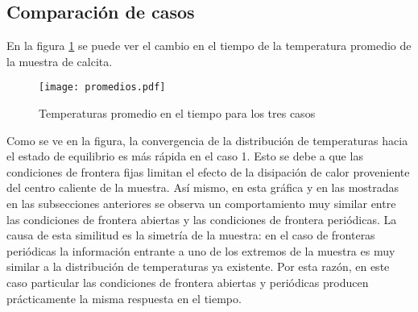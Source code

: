 \documentclass[10pt, twocolumn]{article}
\begin{document}
\subsection{Comparación de casos}
En la figura \ref{promedios} se puede ver el cambio en el tiempo de la temperatura promedio de la muestra de calcita.
\begin{figure}[h]
\centering
\texttt{[image: promedios.pdf]}
\caption{Temperaturas promedio en el tiempo para los tres casos}
\label{promedios}
\end{figure}
Como se ve en la figura, la convergencia de la distribución de temperaturas hacia el estado de equilibrio es más rápida en el caso 1. Esto se debe a que las condiciones de frontera fijas limitan el efecto de la disipación de calor proveniente del centro caliente de la muestra. Así mismo, en esta gráfica y en las mostradas en las subsecciones anteriores se observa un comportamiento muy similar entre las condiciones de frontera abiertas y las condiciones de frontera periódicas. La causa de esta similitud es la simetría de la muestra: en el caso de fronteras periódicas la información entrante a uno de los extremos de la muestra es muy similar a la distribución de temperaturas ya existente. Por esta razón, en este caso particular las condiciones de frontera abiertas y periódicas producen prácticamente la misma respuesta en el tiempo.
\end{document}
